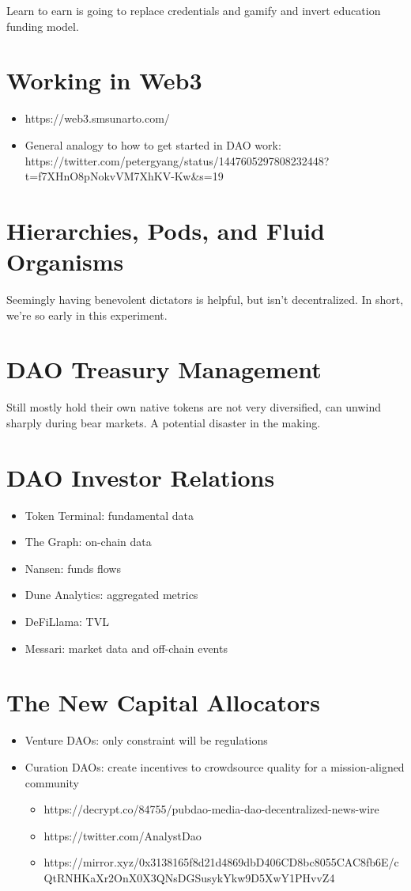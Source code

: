 \documentclass{../notes}
\begin{document}
Learn to earn is going to replace credentials and gamify and invert education funding model. 

\section{Working in Web3}
\begin{itemize}
    \item https://web3.smsunarto.com/
    \item General analogy to how to get started in DAO work: https://twitter.com/petergyang/status/1447605297808232448?t=f7XHnO8pNokvVM7XhKV-Kw\&s=19
\end{itemize}

\section{Hierarchies, Pods, and Fluid Organisms}
Seemingly having benevolent dictators is helpful, but isn't decentralized. In short, we're so early in this experiment. 

\section{DAO Treasury Management}
Still mostly hold their own native tokens are not very diversified, can unwind sharply during bear markets. A potential disaster in the making. 

\section{DAO Investor Relations}
\begin{itemize}
    \item Token Terminal: fundamental data
    \item The Graph: on-chain data
    \item Nansen: funds flows
    \item Dune Analytics: aggregated metrics
    \item DeFiLlama: TVL
    \item Messari: market data and off-chain events
\end{itemize}

\section{The New Capital Allocators}
\begin{itemize}
    \item Venture DAOs: only constraint will be regulations
    \item Curation DAOs: create incentives to crowdsource quality for a mission-aligned community
        \begin{itemize}
            \item https://decrypt.co/84755/pubdao-media-dao-decentralized-news-wire
            \item https://twitter.com/AnalystDao
            \item https://mirror.xyz/0x3138165f8d21d4869dbD406CD8bc8055CAC8fb6E/cQtRNHKaXr2OnX0X3QNsDGSusykYkw9D5XwY1PHvvZ4
        \end{itemize}
\end{itemize}
\end{document}
